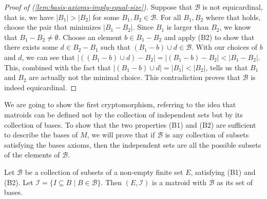 \begin{proof}[Proof of (\ref{lem:basis-axioms-imply-equal-size})]
    Suppose that $\mathcal{B}$ is not equicardinal, that is, we have $|B_1|>|B_2|$ for some $B_1,B_2\in\mathcal{B}$. For all $B_1,B_2$ where that holds, choose the pair that minimizes $|B_1-B_2|$. Since $B_1$ is larger than $B _2$, we know that $B _1 - B _2 \neq \emptyset$. Choose an element $b\in B_1-B_2$ and apply (B2) to show that there exists some $d\in B_2-B_1$ such that $(B_1-b)\cup d \in\mathcal{B}$. With our choices of $b$ and $d$, we can see that $|((B_1-b)\cup d)-B_2|=|(B_1-b)-B_2|<|B_1-B_2|$. This, combined with the fact that $|(B_1-b)\cup d|=|B_1|<|B_2|$, tells us that $B_1$ and $B_2$ are actually not the minimal choice. This contradiction proves that $\mathcal{B}$ is indeed equicardinal.
\end{proof}

We are going to show the first cryptomorphism, referring to the idea that matroids can be defined not by the collection of independent sets but by its collection of bases. To show that the two properties (B1) and (B2) are sufficient to describe the bases of $M$, we will prove that if $\mathcal{B}$ is any collection of subsets satisfying the bases axioms, then the independent sets are all the possible subsets of the elements of $\mathcal{B}$.

\begin{theorem}\label{thm:basis-axioms-form-matroid}
    Let $\mathcal{B}$ be a collection of subsets of a non-empty finite set $E$, satisfying (B1) and (B2). Let $\mathcal{I}=\{ I\subseteq B \; | \; B\in\mathcal{B} \}$. Then $(E,\mathcal{I})$ is a matroid with $\mathcal{B}$ as its set of bases.
\end{theorem}


